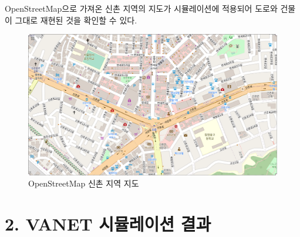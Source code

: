     OpenStreetMap으로 가져온 신촌 지역의 지도가 시뮬레이션에 적용되어 도로와 건물이 그대로 재현된 것을 확인할 수 있다.
    \vspace{-3mm}
    \begin{figure}[!h]\centering 
        \includegraphics[width=.80\textwidth]{image/week14/1-12.png}
        \caption{\footnotesize
        OpenStreetMap 신촌 지역 지도}
        \vspace{-10pt}
    \end{figure}

\clearpage
\section*{2. VANET 시뮬레이션 결과}

